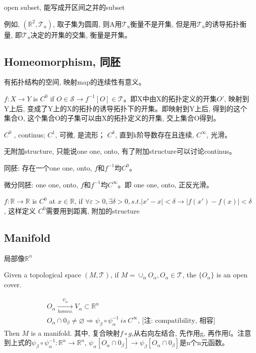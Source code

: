 \documentclass[UTF8]{../09-Mathematics}
\begin{document}
open subset, 能写成开区间之并的subset 

例如, $(\mathbb R^2, \mathscr T_u)$, 取子集为圆周, 则A用$\mathscr T_u$衡量不是开集, 但是用$\mathscr T_u$的诱导拓扑衡量, 即$\mathscr T_u$决定的开集的交集, 衡量是开集。


\subsection{Homeomorphism, 同胚}

有拓扑结构的空间, 映射map的连续性有意义。

$f:X \to Y$ is $C^0$ if $ O \in \mathscr S \rightarrow f^{-1}[O] \in \mathscr T$。即X中由X的拓扑定义的开集$O'$, 映射到Y上后, 变成了Y上的X的拓扑的诱导拓扑下的开集。即映射到Y上后, 得到的这个集合O, 这个集合O的子集可以由X的拓扑定义的开集, 交上集合O得到。

$C^0$ ,  continus; $C^1$, 可微, 是流形； $C^k$, 直到k阶导数存在且连续,  $C^\infty$, 光滑。


无附加structure, 只能说one one, onto,  有了附加structure可以讨论continus。

同胚: 存在一个one one, onto,  $f$和$f^{-1}$均$C^0$。

微分同胚: one one, onto,  $f$和$f^{-1}$均$C^\infty$。即 one one, onto,  正反光滑。

$f: \mathbb{R} \to \mathbb{R} $ is $C^0$ at $x\in  \mathbb{R}$, if $\forall \varepsilon >0, \exists \delta >0, s.t. |x' - x| < \delta \rightarrow |f(x') - f(x)| <   \delta$, 这样定义 $C^0$需要用到距离, 附加的structure


\subsection{Manifold}

局部像$\mathbb R ^n$


Given a topological space $(M, \mathscr T)$, if $M = \cup _ \alpha O_\alpha , O_\alpha \in \mathscr T$, the $\{ O_\alpha\}$ is an open cover.

\begin{displaymath}
  \begin{split}
    & O _\alpha \xrightarrow[homeo.]{\psi_\alpha } V_\alpha \subset \mathbb R^n \\
    & O_\alpha \cap 0_\beta \neq \varnothing \Longrightarrow \psi_\beta \circ \psi_\alpha ^ {-1} \ is \ C^ \infty \mbox{, [注: compatibility, 相容]}
  \end{split}
\end{displaymath}
Then $M$ is a manifold. 其中, 复合映射$f \circ g$,从右向左结合, 先作用g, 再作用f。注意到上式的$\psi_\beta \circ \psi_\alpha ^ {-1}: \mathbb R^n \to \mathbb R^n$, $\psi_\alpha[O_\alpha \cap 0_\beta] \to \psi_\beta[O_\alpha \cap 0_\beta] $是n个n元函数。
\end{document}
